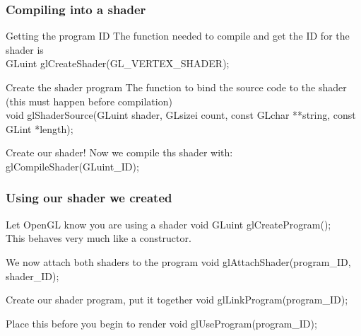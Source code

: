 \documentclass{beamer}
\begin{document}
\begin{frame}

  \frametitle{Compiling into a shader}

  \begin{block}{Getting the program ID}
    The function needed to compile and get the ID for the shader is\\
    GLuint glCreateShader(GL\_VERTEX\_SHADER);
  \end{block}

  \begin{block}{Create the shader program}
    The function to bind the source code to the shader (this must happen before compilation)\\
    void glShaderSource(GLuint shader,
    GLsizei count,
    const GLchar **string,
    const GLint *length);
  \end{block}

  \begin{block}{Create our shader!}
    Now we compile ths shader with:\\
    glCompileShader(GLuint\_ID);
  \end{block}

\end{frame}

\begin{frame}

  \frametitle{Using our shader we created}

  \begin{block}{Let OpenGL know you are using a shader}
    void GLuint glCreateProgram();\\
    This behaves very much like a constructor.
  \end{block}

  \begin{block}{We now attach both shaders to the program}
    void glAttachShader(program\_ID, shader\_ID);
  \end{block}

  \begin{block}{Create our shader program, put it together}
    void glLinkProgram(program\_ID);
  \end{block}

  \begin{block}{Place this before you begin to render}
    void glUseProgram(program\_ID);
  \end{block}

\end{frame}
\end{document}
